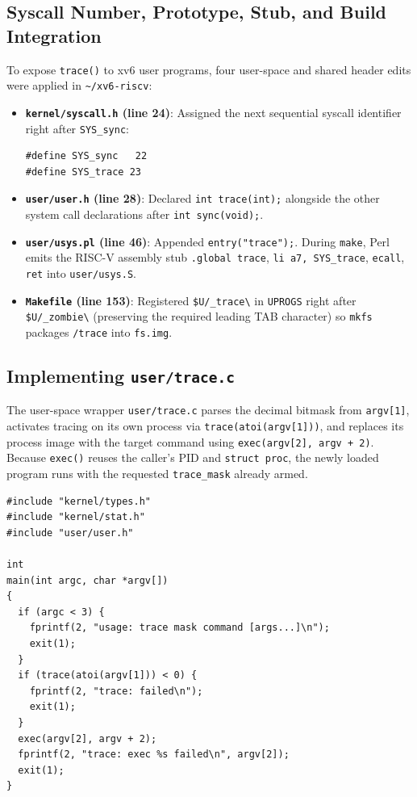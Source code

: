 \documentclass[12pt,a4paper]{article}
\begin{document}
\subsection{Syscall Number, Prototype, Stub, and Build Integration}
To expose \texttt{trace()} to xv6 user programs, four user-space and shared header edits were applied in \texttt{\textasciitilde/xv6-riscv}:
\begin{itemize}
    \item \textbf{\texttt{kernel/syscall.h} (line 24)}: Assigned the next sequential syscall identifier right after \texttt{SYS\_sync}:
\begin{lstlisting}[style=cstyle]
#define SYS_sync   22
#define SYS_trace 23
\end{lstlisting}
    \item \textbf{\texttt{user/user.h} (line 28)}: Declared \texttt{int trace(int);} alongside the other system call declarations after \texttt{int sync(void);}.
    \item \textbf{\texttt{user/usys.pl} (line 46)}: Appended \texttt{entry("trace");}. During \texttt{make}, Perl emits the RISC-V assembly stub \texttt{.global trace}, \texttt{li a7, SYS\_trace}, \texttt{ecall}, \texttt{ret} into \texttt{user/usys.S}.
    \item \textbf{\texttt{Makefile} (line 153)}: Registered \texttt{\$U/\_trace\textbackslash} in \texttt{UPROGS} right after \texttt{\$U/\_zombie\textbackslash} (preserving the required leading TAB character) so \texttt{mkfs} packages \texttt{/trace} into \texttt{fs.img}.
\end{itemize}

\subsection{Implementing \texttt{user/trace.c}}
The user-space wrapper \texttt{user/trace.c} parses the decimal bitmask from \texttt{argv[1]}, activates tracing on its own process via \texttt{trace(atoi(argv[1]))}, and replaces its process image with the target command using \texttt{exec(argv[2], argv + 2)}. Because \texttt{exec()} reuses the caller's PID and \texttt{struct proc}, the newly loaded program runs with the requested \texttt{trace\_mask} already armed.

\begin{lstlisting}[style=cstyle,caption={User-space wrapper \texttt{user/trace.c}}]
#include "kernel/types.h"
#include "kernel/stat.h"
#include "user/user.h"

int
main(int argc, char *argv[])
{
  if (argc < 3) {
    fprintf(2, "usage: trace mask command [args...]\n");
    exit(1);
  }
  if (trace(atoi(argv[1])) < 0) {
    fprintf(2, "trace: failed\n");
    exit(1);
  }
  exec(argv[2], argv + 2);
  fprintf(2, "trace: exec %s failed\n", argv[2]);
  exit(1);
}
\end{lstlisting}
\end{document}
